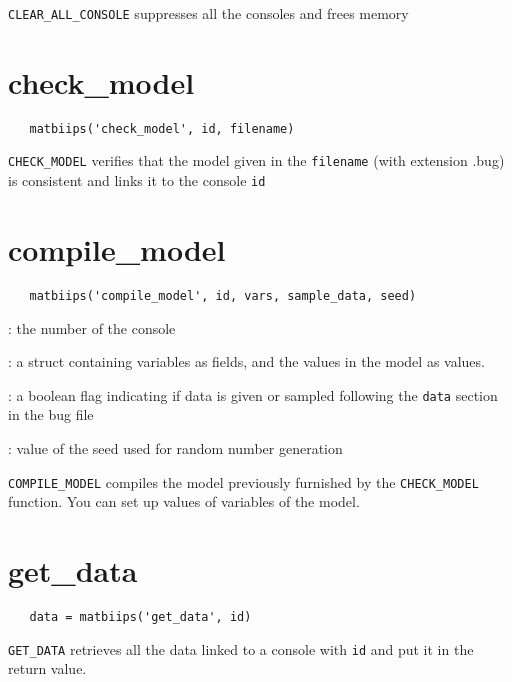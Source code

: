 \documentclass[11pt,twoside]{article}
\begin{document}
  \texttt{CLEAR\_ALL\_CONSOLE} suppresses all the consoles and frees memory

\section{check\_model}

 \begin{lstlisting}
   matbiips('check_model', id, filename)
 \end{lstlisting}

 \texttt{CHECK\_MODEL} verifies that the model given in the \texttt{filename} (with extension .bug) is consistent and links it to the console \texttt{id}

\section{compile\_model}

 \begin{lstlisting}
   matbiips('compile_model', id, vars, sample_data, seed)
 \end{lstlisting}
   \begin{description}
   \setlength{\baselineskip}{0.1\baselineskip}
     \item[\texttt{id}]: the number of the console
     \item[\texttt{vars}]: a struct containing variables as fields, and the values in the model as values.
     \item[\texttt{sample\_data}]: a boolean flag indicating if data is given or sampled following the \texttt{data} section in the bug file
     \item[\texttt{seed}]: value of the seed used for random number generation

   \end{description}

   \texttt{COMPILE\_MODEL} compiles the model previously furnished by the \texttt{CHECK\_MODEL} function. You can set up values of variables of
   the model.


\section{get\_data}

 \begin{lstlisting}
   data = matbiips('get_data', id)
 \end{lstlisting}

  \texttt{GET\_DATA} retrieves all the data linked to a console with \texttt{id} and put it in the return value.
\end{document}
